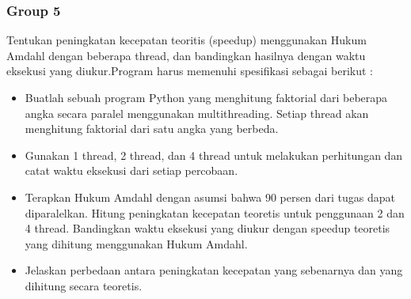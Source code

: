 \documentclass[12pt]{article}
\begin{document}
	\subsubsection{Group 5}
	Tentukan peningkatan kecepatan teoritis (speedup) menggunakan Hukum Amdahl dengan beberapa thread, dan bandingkan hasilnya dengan waktu eksekusi yang diukur.Program harus memenuhi spesifikasi sebagai berikut :
	\begin{itemize}
		\item Buatlah sebuah program Python yang menghitung faktorial dari beberapa angka secara paralel menggunakan multithreading. Setiap thread akan menghitung faktorial dari satu angka yang berbeda.
		\item Gunakan 1 thread, 2 thread, dan 4 thread untuk melakukan perhitungan dan catat waktu eksekusi dari setiap percobaan.
		\item Terapkan Hukum Amdahl dengan asumsi bahwa 90 persen dari tugas dapat diparalelkan. Hitung peningkatan kecepatan teoretis untuk penggunaan 2 dan 4 thread.
		Bandingkan waktu eksekusi yang diukur dengan speedup teoretis yang dihitung menggunakan Hukum Amdahl.
		
		\item Jelaskan perbedaan antara peningkatan kecepatan yang sebenarnya dan yang dihitung secara teoretis.
	\end{itemize}
\end{document}
